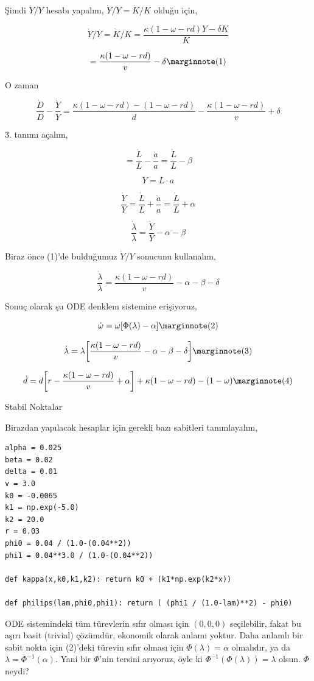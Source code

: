 \documentclass[12pt,fleqn]{article}\usepackage{../../common}
\begin{document}
Şimdi $\dot{Y}/Y$ hesabı yapalım, $\dot{Y}/Y = \dot{K}/K$ olduğu için,

$$ 
\dot{Y}/Y = \dot{K}/K = \frac{\kappa(1 - \omega - rd) Y - \delta K}{K}
$$

$$ 
 = \frac{\kappa(1 - \omega - rd) }{v}- \delta 
\mlabel{1}
$$

O zaman 

$$  
\frac{\dot{D}}{D} - \frac{\dot{Y}}{Y} =
\frac{ \kappa(1 - \omega - rd) - (1-\omega-rd) }{d} 
- \frac{\kappa(1 - \omega - rd) }{v} + \delta
$$

3. tanımı açalım,

$$  =  \frac{\dot{L}}{L} - \frac{\dot{a}}{a} = \frac{\dot{L}}{L} - \beta $$

$$ Y = L \cdot a $$

$$ 
\frac{\dot{Y}}{Y} = \frac{\dot{L}}{L} + \frac{\dot{a}}{a}
= \frac{\dot{L}}{L} + \alpha
$$

$$ \frac{\dot{\lambda}}{\lambda} = \frac{\dot{Y}}{Y} - \alpha - \beta $$

Biraz önce (1)'de bulduğumuz $\dot{Y}/Y$ sonucunu kullanalım,

$$ 
\frac{\dot{\lambda}}{\lambda} = 
\frac{\kappa(1-\omega-rd)}{v} - \alpha - \beta - \delta
$$

Sonuç olarak şu ODE denklem sistemine erişiyoruz, 

$$ 
\dot{\omega} = \omega [ \Phi(\lambda)-\alpha ] 
\mlabel{2}
$$ 

$$ 
\dot{\lambda}=  \lambda \bigg[ 
\frac{\kappa(1-\omega-rd)}{v} - \alpha - \beta - \delta
\bigg]
\mlabel{3}
$$

$$ 
\dot{d} = d \bigg[
r - \frac{\kappa(1-\omega-rd)}{v} + \alpha 
\bigg] + \kappa(1-\omega-rd) - (1-\omega)
\mlabel{4}
$$

Stabil Noktalar

Birazdan yapılacak hesaplar için gerekli bazı sabitleri tanımlayalım,

\begin{verbatim}
alpha = 0.025
beta = 0.02
delta = 0.01
v = 3.0
k0 = -0.0065
k1 = np.exp(-5.0)
k2 = 20.0
r = 0.03
phi0 = 0.04 / (1.0-(0.04**2))
phi1 = 0.04**3.0 / (1.0-(0.04**2))

def kappa(x,k0,k1,k2): return k0 + (k1*np.exp(k2*x))

def philips(lam,phi0,phi1): return ( (phi1 / (1.0-lam)**2) - phi0)
\end{verbatim}

ODE sistemindeki tüm türevlerin sıfır olması için $(0,0,0)$ seçilebilir, fakat
bu aşırı basit (trivial) çözümdür, ekonomik olarak anlamı yoktur. Daha anlamlı
bir sabit nokta için (2)'deki türevin sıfır olması için $\Phi(\lambda)=\alpha$
olmalıdır, ya da $\lambda=\Phi^{-1}(\alpha)$. Yani bir $\Phi$'nin tersini
arıyoruz, öyle ki $\Phi^{-1}(\Phi(\lambda)) = \lambda$ olsun. $\Phi$ neydi?
\end{document}

